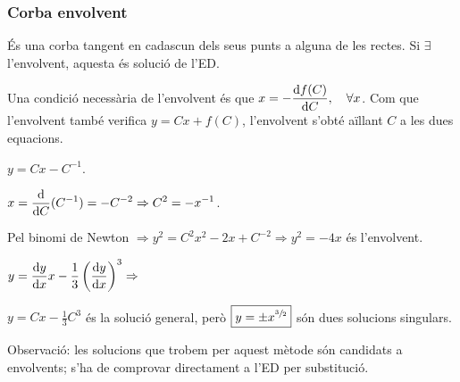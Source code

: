 \subsubsection*{Corba envolvent}
\begin{defi}
	És una corba tangent en cadascun dels seus punts a alguna de les rectes. Si $\exists$ l'envolvent, aquesta és solució de l'ED.
\end{defi}
Una condició necessària de l'envolvent és que $\displaystyle x = - \frac{\mathrm{d} f(C)}{\mathrm{d} C}, \quad \forall x$. Com que l'envolvent també verifica $y = Cx + f(C)$, l'envolvent s'obté aïllant $C$ a les dues equacions.
\begin{example}
	$y = Cx - C^{-1}$.

	$\displaystyle x = \frac{\mathrm{d}}{\mathrm{d} C} (C^{-1}) = - C^{-2} \Rightarrow C^{2} = -x^{-1}$.

	Pel binomi de Newton $\Rightarrow y^{2} = C^{2} x^{2} - 2x + C^{-2} \Rightarrow \boxed{y^{2} = -4x}$ és l'envolvent.
\end{example}
\begin{example}
	$\displaystyle y = \frac{\mathrm{d} y}{\mathrm{d} x} x - \frac{1}{3} \left( \frac{\mathrm{d} y}{\mathrm{d} x} \right)^{3} \Rightarrow$

    $\boxed{y = Cx - \frac{1}{3} C^{3}}$ és la solució general, però $\boxed{y = \pm x^{\sfrac{3}{2}}}$ són dues solucions singulars.
\end{example}
Observació: les solucions que trobem per aquest mètode són candidats a envolvents; s'ha de comprovar directament a l'ED per substitució.


